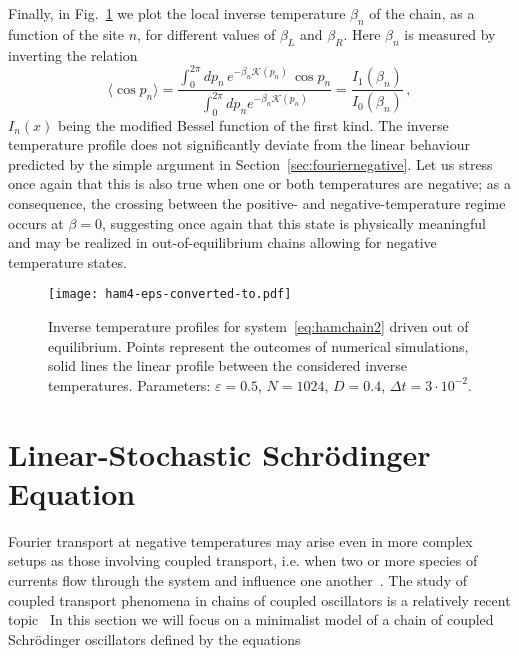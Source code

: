 \documentclass[iop, twocolumns, amssymb,notitlepage]{revtex4-1}
\newcommand{\indice}{n}
\begin{document}
 
 Finally, in Fig.~\ref{fig:ham4} we plot the local inverse temperature $\beta_\indice$ 
of the chain, as a function of the site $n$, for different values of $\beta_L$ 
and $\beta_R$. Here $\beta_\indice$ is measured by inverting the relation
 \begin{equation}
  \langle \cos p_\indice \rangle = \frac{ \int_0^{2\pi} d p_\indice\, e^{-\beta_\indice \mathcal{K}(p_\indice)}\, \cos p_\indice}{ \int_0^{2\pi} d p_\indice e^{-\beta_\indice \mathcal{K}(p_\indice)}} =\frac{I_1(\beta_\indice)}{I_0(\beta_\indice)}\,,
 \end{equation} 
 $I_n(x)$ being the modified Bessel function of the first kind. The inverse 
temperature profile does not significantly deviate from the linear behaviour 
predicted by the simple argument in Section~\ref{sec:fouriernegative}. Let us 
stress once again that this is also true when one or both temperatures are 
negative; as a consequence, the crossing between the positive- and 
negative-temperature regime occurs at $\beta=0$, suggesting once again that this 
state is physically meaningful and may be realized in out-of-equilibrium chains 
allowing for negative temperature states.
 
 
 
 \begin{figure}
 \centering
\texttt{[image: ham4-eps-converted-to.pdf]}
\caption{\label{fig:ham4} Inverse temperature profiles for system~\eqref{eq:hamchain2} driven out of equilibrium. Points represent the outcomes of numerical simulations, solid lines the linear profile between the considered inverse temperatures. Parameters: $\varepsilon=0.5$, $N=1024$, $D=0.4$, $\Delta t=3 \cdot 10^{-2}$.}
 \end{figure}

\section{Linear-Stochastic Schr\"{o}dinger Equation}
\label{sec:schr}


Fourier transport at negative temperatures may arise even in more complex setups as those involving coupled transport,
i.e. when two or more species of currents flow through the system and influence one another~\cite{livi17}. 
The study of coupled transport phenomena in chains of coupled oscillators is a relatively recent topic~\cite{iubini12,iubini14,borlenghi15,iubini16,wang20,iacobucci20}
In this section we will focus on a minimalist model of a chain of coupled Schr\"odinger oscillators defined by
the equations
\end{document}
